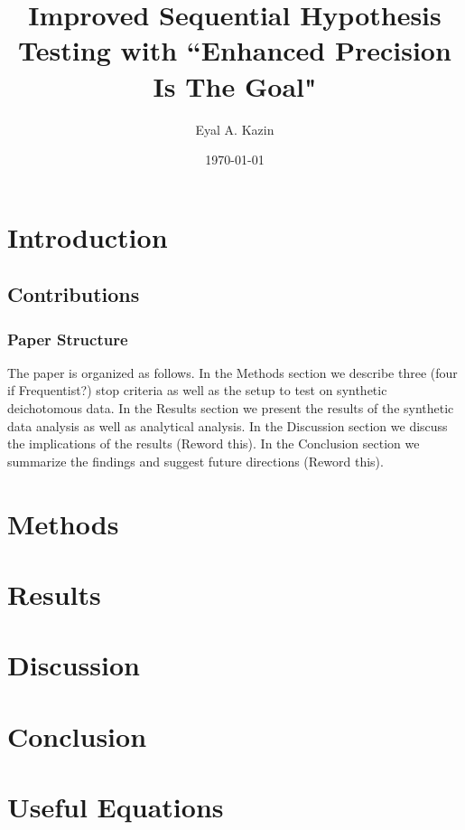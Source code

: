 \documentclass{article}
\title{Improved Sequential Hypothesis Testing with
``Enhanced Precision Is The Goal"}
\date{\today}
\author{Eyal A. Kazin}
\begin{document}
\maketitle



\section{Introduction}


\subsection{Contributions}

\subsubsection{Paper Structure}
The paper is organized as follows.
In the Methods section we describe three (four if Frequentist?)
stop criteria as well as the setup to test on synthetic deichotomous data.
In the Results section we present the results of the synthetic data analysis as well as analytical analysis.
In the Discussion section we discuss the implications of the results (Reword this).
In the Conclusion section we summarize the findings and suggest future directions (Reword this).


\section{Methods}



\section{Results}



\section{Discussion}

\section{Conclusion}

\section{Useful Equations}

\end{document}
